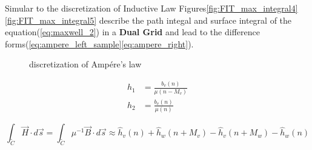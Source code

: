 Simular to the discretization of Inductive Law Figures\ref{fig:FIT_max_integral4}\ref{fig:FIT_max_integral5} describe the path integal and surface integral of the equation(\ref{eq:maxwell_2}) in a \textbf{Dual Grid} and lead to the difference forms(\ref{eq:ampere_left_sample}\ref{eq:ampere_right}).

\begin{figure}
\hfill
\caption{discretization of Amp\'ere's law}
\end{figure}

\begin{align}
h_{1}&=\frac{b_{v}(n)}{\mu (n-M_{v})}\\
h_{2}&=\frac{b_{v}(n)}{\mu (n)}
\label{eq:megnetic_field}
\end{align}

%

\begin{equation}
\int_{\tilde{C}}\vec{H}\cdot d\vec{s}=\int_{\tilde{C}}\mu^{-1}\vec{B}\cdot d\vec{s}\approx
\widehat{h}_{v}(n)
+\widehat{h}_{w}(n+M_{v})
-\widehat{h}_{v}(n+M_{w})
-\widehat{h}_{w}(n)
\label{eq:ampere_left_sample}
\end{equation}

